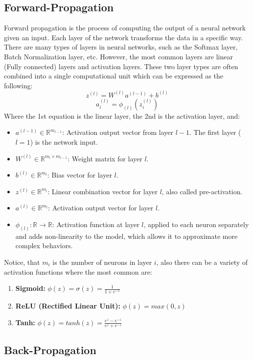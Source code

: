 \documentclass[12pt,a4paper]{report}
\begin{document}
\subsection{Forward-Propagation}
Forward propagation is the process of computing the output of a neural network given an input. Each layer of the network transforms the data in a specific way. There are many types of layers in neural networks, such as the Softmax layer, Batch Normalization layer, etc. However, the most common layers are linear (Fully connected) layers and activation layers. These two layer types are often combined into a single computational unit which can be expressed as the following: $$z^{(l)}=W^{(l)}a^{(l-1)}+b^{(l)}$$ $$a_i^{(l)}=\phi_{(l)}(z_i^{(l)})$$ Where the 1st equation is the linear layer, the 2nd is the activation layer, and:
\begin{itemize}
    \item $a^{(l-1)}\in\mathbb{R}^{m_{l-1}}$: Activation output vector from layer $l-1$. The first layer ($l=1$) is the network input.
    \item $W^{(l)}\in\mathbb{R}^{m_{l}\times{m_{l-1}}}$: Weight matrix for layer $l$.
    \item $b^{(l)}\in\mathbb{R}^{m_l}$: Bias vector for layer $l$.
    \item $z^{(l)}\in\mathbb{R}^{m_l}$: Linear combination vector for layer $l$, also called pre-activation.
    \item $a^{(l)}\in\mathbb{R}^{m_l}$: Activation output vector for layer $l$.
    \item $\phi_{(l)}:\mathbb{R}\to\mathbb{R}$: Activation function at layer $l$, applied to each neuron separately and adds non-linearity to the model, which allows it to approximate more complex behaviors.
\end{itemize}
Notice, that $m_{i}$ is the number of neurons in layer $i$, also there can be a variety of activation functions where the most common are:
\begin{enumerate}
    \item \textbf{Sigmoid:} $\phi(z)=\sigma(z)=\frac{1}{1+e^{-z}}$ %
    \item \textbf{ReLU (Rectified Linear Unit):} $\phi(z)=max(0,z)$
    \item \textbf{Tanh:} $\phi(z)=tanh(z)=\frac{e^z-e^{-z}}{e^z+e^{-z}}$
\end{enumerate}
\subsection{Back-Propagation}
\end{document}
